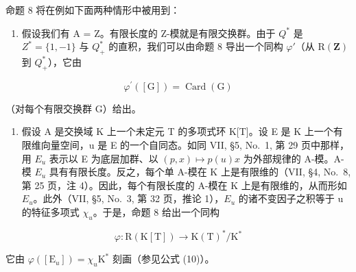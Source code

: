 命题 8 将在例如下面两种情形中被用到：

\begin{enumerate}
\def\labelenumi{\alph{enumi})}
\tightlist
\item
  假设我们有 A = Z。有限长度的 Z-模就是有限交换群。由于 \(Q^{*}\) 是 \(Z^{*} = \{1, -1\}\) 与 \(Q_{+}^{*}\) 的直积，我们可以由命题 8 导出一个同构 \(\varphi'\)（从 \(\mathrm{R}(\mathbf{Z})\) 到 \(Q_{+}^{*}\)），它由
\end{enumerate}

\[
\varphi^ {\prime} ([ \mathrm{G} ]) = \operatorname{Card} (\mathrm{G})
\]

（对每个有限交换群 G）给出。

\begin{enumerate}
\def\labelenumi{\alph{enumi})}
\setcounter{enumi}{1}
\tightlist
\item
  假设 A 是交换域 K 上一个未定元 T 的多项式环 K{[}T{]}。设 E 是 K 上一个有限维向量空间，u 是 E 的一个自同态。如同 VII, §5, No.~1, 第 29 页中那样，用 \(E_{u}\) 表示以 E 为底层加群、以 \((p, x) \mapsto p(u)x\) 为外部规律的 A-模。A-模 \(E_{u}\) 具有有限长度。反之，每个单 A-模在 K 上是有限维的（VII, §4, No.~8, 第 25 页，注 4）。因此，每个有限长度的 A-模在 K 上是有限维的，从而形如 \(E_{u}\)。此外（VII, §5, No.~3, 第 32 页，推论 1），\(E_{u}\) 的诸不变因子之积等于 u 的特征多项式 \(\chi_{u}\)。于是，命题 8 给出一个同构
\end{enumerate}

\[
\varphi : \mathrm{R} (\mathrm{K} [ \mathrm{T} ]) \to \mathrm{K} (\mathrm{T}) ^ {*} / \mathrm{K} ^ {*}
\]

它由 \(\varphi([\mathrm{E}_u]) = \chi_u\mathrm{K}^*\) 刻画（参见公式 (10)）。

